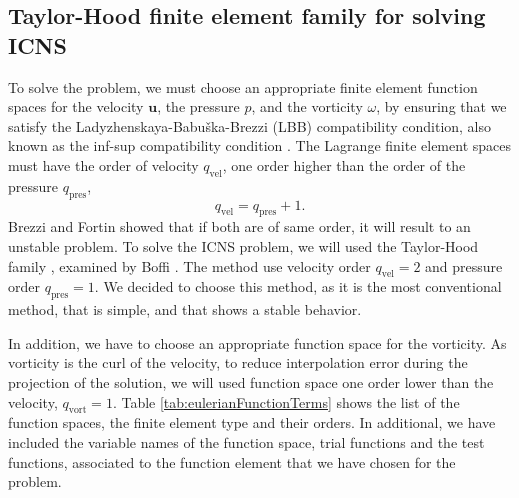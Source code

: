 \subsection{Taylor-Hood finite element family for solving ICNS}
To solve the  problem, we must choose an appropriate finite element function spaces for the velocity $\mathbf{u}$, the pressure $p$, and the vorticity $\omega$, by ensuring that we satisfy the Ladyzhenskaya-Babu\v{s}ka-Brezzi (LBB) compatibility condition, also known as the inf-sup compatibility condition \cite{Brezzi1991}. The Lagrange finite element spaces must have the order of velocity $q_{\mathrm{vel}}$, one order higher than the order of the pressure $q_{\mathrm{pres}}$,
	\begin{equation}
	q_{\mathrm{vel}} = 	q_{\mathrm{pres}} + 1.
	\end{equation}
Brezzi and Fortin \cite{Brezzi1991} showed that if both are of same order, it will result to an unstable problem. To solve the ICNS problem, we will used the Taylor-Hood family \cite{Taylor1973}, examined by Boffi \cite{Boffi1997}. The method use velocity order $q_{\mathrm{vel}} = 2$ and pressure order $q_{\mathrm{pres}} = 1$. We decided to choose this method, as it is the most conventional method, that is simple, and that shows a stable behavior.

In addition, we have to choose an appropriate function space for the vorticity. As vorticity is the curl of the velocity, to reduce interpolation error during the projection of the solution, we will used function space one order lower than the velocity, $q_{\mathrm{vort}} = 1$. Table \ref{tab:eulerianFunctionTerms} shows the list of the function spaces, the finite element type and their orders. In additional, we have included the variable names of the function space, trial functions and the test functions, associated to the function element that we have chosen for the problem.



